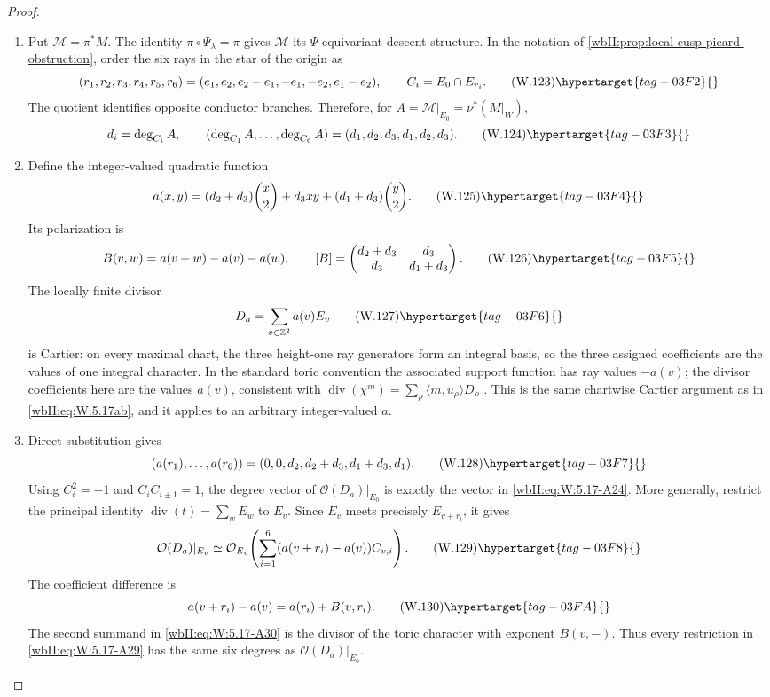 \begin{proof}

\begin{enumerate}[label=\arabic*.,leftmargin=*]
\item Put \(\mathcal M=\pi^*M\).  The identity
\(\pi\circ\Psi_\lambda=\pi\) gives \(\mathcal M\) its \(\Psi\)-equivariant descent structure.  In the notation of
\cref{wbII:prop:local-cusp-picard-obstruction}, order the six rays in the star
of the origin as
\[
 (r_1,r_2,r_3,r_4,r_5,r_6)
 =(e_1,e_2,e_2-e_1,-e_1,-e_2,e_1-e_2),
 \qquad C_i=E_0\cap E_{r_i}.
\tag{W.123}\hypertarget{tag-03F2}{}\label{wbII:eq:W:5.17-A23}
\]
The quotient identifies opposite conductor branches.  Therefore, for
\(A=\mathcal M|_{E_0}=\nu^*(M|_W)\),
\[
 d_i=\deg_{C_i}A,
 \qquad
 (\deg_{C_1}A,\ldots,\deg_{C_6}A)
 =(d_1,d_2,d_3,d_1,d_2,d_3).
\tag{W.124}\hypertarget{tag-03F3}{}\label{wbII:eq:W:5.17-A24}
\]

\item Define the integer-valued quadratic function
\[
 a(x,y)
 =(d_2+d_3)\binom{x}{2}+d_3xy+(d_1+d_3)\binom{y}{2}.
\tag{W.125}\hypertarget{tag-03F4}{}\label{wbII:eq:W:5.17-A25}
\]
Its polarization is
\[
 B(v,w)=a(v+w)-a(v)-a(w),
 \qquad
 [B]=
 \begin{pmatrix}
  d_2+d_3&d_3\\ d_3&d_1+d_3
 \end{pmatrix}.
\tag{W.126}\hypertarget{tag-03F5}{}\label{wbII:eq:W:5.17-A26}
\]
The locally finite divisor
\[
 D_a=\sum_{v\in\mathbb Z^2}a(v)E_v
\tag{W.127}\hypertarget{tag-03F6}{}\label{wbII:eq:W:5.17-A27}
\]
is Cartier: on every maximal chart, the three height-one ray generators
form an integral basis, so the three assigned coefficients are the values
of one integral character.  In the standard toric convention the associated
support function has ray values \(-a(v)\); the divisor coefficients here are
the values \(a(v)\), consistent with
\(\operatorname{div}(\chi^m)=\sum_\rho\langle m,u_\rho\rangle D_\rho\)
\cite[2010 text, Propositions~4.1.1--4.1.2, p.~171; Theorems~4.2.8,
p.~181 and~4.2.12, p.~184]{CoxLittleSchenck2011}.
This is the same chartwise Cartier argument as
in \eqref{wbII:eq:W:5.17ab}, and it applies to an arbitrary integer-valued \(a\).

\item Direct substitution gives
\[
 (a(r_1),\ldots,a(r_6))
 =(0,0,d_2,d_2+d_3,d_1+d_3,d_1).
\tag{W.128}\hypertarget{tag-03F7}{}\label{wbII:eq:W:5.17-A28}
\]
Using \(C_i^2=-1\) and \(C_iC_{i\pm1}=1\), the degree vector of
\(\mathcal O(D_a)|_{E_0}\) is exactly the vector in \eqref{wbII:eq:W:5.17-A24}.  More
generally, restrict the principal identity
\(\operatorname{div}(t)=\sum_wE_w\) to \(E_v\).  Since \(E_v\) meets
precisely \(E_{v+r_i}\), it gives
\[
 \mathcal O(D_a)|_{E_v}
 \simeq
 \mathcal O_{E_v}\!\left(
   \sum_{i=1}^6(a(v+r_i)-a(v))C_{v,i}
 \right).
\tag{W.129}\hypertarget{tag-03F8}{}\label{wbII:eq:W:5.17-A29}
\]
The coefficient difference is
\[
 a(v+r_i)-a(v)=a(r_i)+B(v,r_i).
\tag{W.130}\hypertarget{tag-03FA}{}\label{wbII:eq:W:5.17-A30}
\]
The second summand in \eqref{wbII:eq:W:5.17-A30} is the divisor of the toric character
with exponent \(B(v,-)\).  Thus every restriction in \eqref{wbII:eq:W:5.17-A29} has the
same six degrees as \(\mathcal O(D_a)|_{E_0}\).


\end{enumerate}
\end{proof}

